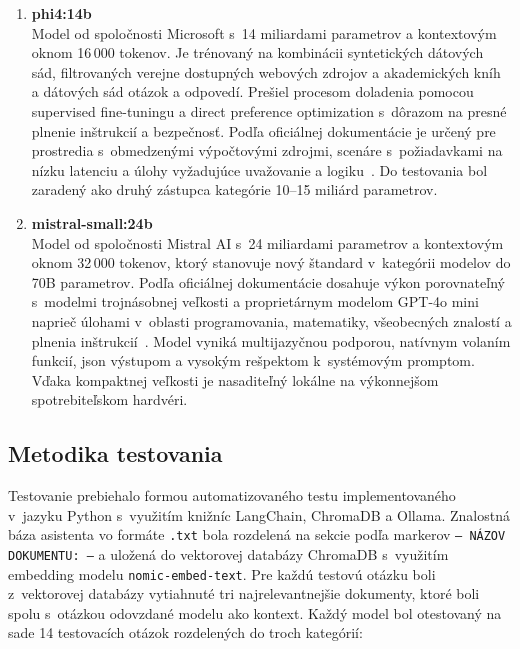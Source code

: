 \begin{enumerate}
      \item \textbf{phi4:14b} \\
            Model od spoločnosti Microsoft s~14 miliardami parametrov a kontextovým oknom
            16\,000 tokenov. Je trénovaný na kombinácii syntetických dátových sád,
            filtrovaných verejne dostupných webových zdrojov a akademických kníh
            a dátových sád otázok a odpovedí. Prešiel procesom doladenia pomocou
            supervised fine-tuningu a direct preference optimization s~dôrazom na presné
            plnenie inštrukcií a bezpečnosť. Podľa oficiálnej dokumentácie je určený
            pre prostredia s~obmedzenými výpočtovými zdrojmi, scenáre s~požiadavkami
            na nízku latenciu a úlohy vyžadujúce uvažovanie a logiku~\cite{t24}.
            Do testovania bol zaradený ako druhý zástupca kategórie 10--15 miliárd parametrov.

      \item \textbf{mistral-small:24b} \\
            Model od spoločnosti Mistral AI s~24 miliardami parametrov a kontextovým oknom
            32\,000 tokenov, ktorý stanovuje nový štandard v~kategórii modelov do 70B parametrov.
            Podľa oficiálnej dokumentácie dosahuje výkon porovnateľný s~modelmi trojnásobnej
            veľkosti a proprietárnym modelom GPT-4o mini naprieč úlohami v~oblasti programovania,
            matematiky, všeobecných znalostí a plnenia inštrukcií~\cite{t25}.
            Model vyniká multijazyčnou podporou, natívnym volaním funkcií, \acrshort{json} výstupom
            a vysokým rešpektom k~systémovým promptom. Vďaka kompaktnej veľkosti je
            nasaditeľný lokálne na výkonnejšom spotrebiteľskom hardvéri.

\end{enumerate}

\subsection{Metodika testovania}\label{sec:assistant}

Testovanie prebiehalo formou automatizovaného testu implementovaného v~jazyku
Python s~využitím knižníc LangChain, ChromaDB a Ollama. Znalostná báza
asistenta vo formáte \texttt{.txt} bola rozdelená na sekcie podľa markerov
\texttt{--- NÁZOV DOKUMENTU: ---} a uložená do vektorovej databázy ChromaDB
s~využitím embedding modelu \texttt{nomic-embed-text}. Pre každú testovú otázku
boli z~vektorovej databázy vytiahnuté tri najrelevantnejšie dokumenty, ktoré
boli spolu s~otázkou odovzdané modelu ako kontext.
\newpage
Každý model bol otestovaný na sade 14 testovacích otázok rozdelených do troch
kategórií:

